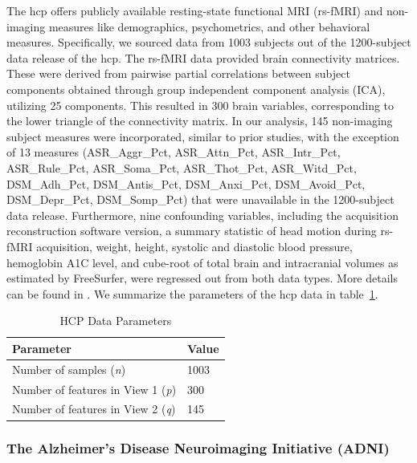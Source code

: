 The \acrshort{hcp} offers publicly available resting-state functional MRI (rs-fMRI) and non-imaging measures like demographics, psychometrics, and other behavioral measures.
Specifically, we sourced data from 1003 subjects out of the 1200-subject data release of the \acrshort{hcp}.
The rs-fMRI data provided brain connectivity matrices. These were derived from pairwise partial correlations between subject components obtained through group independent component analysis (ICA), utilizing 25 components. This resulted in 300 brain variables, corresponding to the lower triangle of the connectivity matrix. In our analysis, 145 non-imaging subject measures were incorporated, similar to prior studies, with the exception of 13 measures (ASR\_Aggr\_Pct, ASR\_Attn\_Pct, ASR\_Intr\_Pct, ASR\_Rule\_Pct, ASR\_Soma\_Pct, ASR\_Thot\_Pct, ASR\_Witd\_Pct, DSM\_Adh\_Pct, DSM\_Antis\_Pct, DSM\_Anxi\_Pct, DSM\_Avoid\_Pct, DSM\_Depr\_Pct, DSM\_Somp\_Pct) that were unavailable in the 1200-subject data release. Furthermore, nine confounding variables, including the acquisition reconstruction software version, a summary statistic of head motion during rs-fMRI acquisition, weight, height, systolic and diastolic blood pressure, hemoglobin A1C level, and cube-root of total brain and intracranial volumes as estimated by FreeSurfer, were regressed out from both data types.
More details can be found in \citet{smith2015positive, mihalik2022canonical}.
We summarize the parameters of the \acrshort{hcp} data in table~\ref{tab:hcp-parameters}.

\begin{table}
    \centering
    \caption{HCP Data Parameters}
    \begin{tabular}{| l | l |}
        \hline
        \textbf{Parameter}                        & \textbf{Value} \\
        \hline
        Number of samples (\textit{n})            & 1003           \\
        Number of features in View 1 (\textit{p}) & 300          \\
        Number of features in View 2 (\textit{q}) & 145            \\
        \hline
    \end{tabular}\label{tab:hcp-parameters}
\end{table}

\subsubsection{The Alzheimer's Disease Neuroimaging Initiative (ADNI)}

